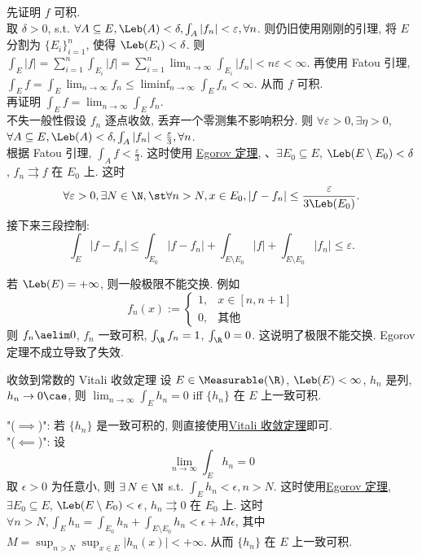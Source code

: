 \begin{prf}
    先证明 $f$ 可积. \\
    取 $\delta>0$, s.t. $\forall A\subseteq E, \Leb(A)<\delta, \int_A |f_n|<\varepsilon, \forall n$. 则仍旧使用刚刚的引理, 将 $E$ 分割为 $\{E_i\}_{i=1}^n$, 使得 $\Leb(E_i)<\delta$. 则 \(\int_E |f| = \sum_{i=1}^n \int_{E_i} |f| = \sum_{i=1}^n \lim_{n\to\infty} \int_{E_i} |f_n| < n\varepsilon < \infty\). 再使用 Fatou 引理, \(\int_E f = \int_E \lim_{n\to\infty} f_n \leq \liminf_{n\to\infty} \int_E f_n < \infty\). 从而 \(f\) 可积.\\
    再证明 \(\int_E f = \lim_{n\to\infty}\int_E f_n\). \\
    不失一般性假设 $f_n$ 逐点收敛, 丢弃一个零测集不影响积分. 则 \(\forall\varepsilon>0, \exists\eta>0\), \(\forall A\subseteq E, \Leb(A)<\delta, \int_A |f_n|<\frac{\varepsilon}{3}, \forall n\). \\
    根据 Fatou 引理, \(\int_A f<\frac{\varepsilon}{3}\). 这时使用 \hyperref[thm:egorov]{Egorov 定理}, 、\(\exists E_0\subseteq E\), \(\Leb(E\setminus E_0)<\delta\), \(f_n\rightrightarrows f\) 在 \(E_0\) 上. 这时
    \[\forall\varepsilon>0, \exists N\in\N, \st \forall n>N, x\in E_0, |f-f_n|\leq\frac{\varepsilon}{3\Leb(E_0)}. \]
    接下来三段控制: 
    \[\int_E |f-f_n|\leq\int_{E_0}|f-f_n|+\int_{E\setminus E_0}|f|+\int_{E\setminus E_0}|f_n|\leq \varepsilon. \]
\end{prf}
\begin{rmk}
    若 $\Leb(E)=+\infty$, 则一般极限不能交换. 例如
    \[f_n(x):=\begin{cases}
        1, & x\in[n,n+1]\\
        0, & \text{其他}
    \end{cases}\]
    则 \(f_n\aelim 0\), \(f_n\) 一致可积, \(\int_{\R} f_n=1\), \(\int_{\R} 0=0\). 这说明了极限不能交换. Egorov 定理不成立导致了失效.
\end{rmk}
\begin{thm}
    {收敛到常数的 Vitali 收敛定理}
    设 $E\in\Measurable(\R)$, \(\Leb(E)<\infty\), \(h_n\) 是\MeasurableFunc{}列, \(h_n\to 0\cae\), 则 \(\lim_{n\to\infty}\int_E h_n=0\) iff \(\{h_n\}\) 在 \(E\) 上一致可积.
\end{thm}
\begin{prf}
    "(\(\implies\))": 若 \(\{h_n\}\) 是一致可积的, 则直接使用\hyperref[thm:vct-1]{Vitali 收敛定理}即可.\\
    "(\(\impliedby\))": 设
    \[\lim_{n\to\infty}\int_E h_n=0\]
    取 \(\epsilon>0\) 为任意小, 则 \(\exists\,N\in\N\) s.t. \(\int_Eh_n<\epsilon, n>N\). 这时使用\hyperref[thm:egorov]{Egorov 定理}, \(\exists E_0\subseteq E\), \(\Leb(E\setminus E_0)<\epsilon\), \(h_n\rightrightarrows 0\) 在 \(E_0\) 上. 这时 \(\forall n>N, \int_E h_n = \int_{E_0} h_n + \int_{E\setminus E_0} h_n < \epsilon + M\epsilon\), 其中 \(M=\sup_{n>N}\sup_{x\in E}|h_n(x)|<+\infty\). 从而 \(\{h_n\}\) 在 \(E\) 上一致可积.
\end{prf}

